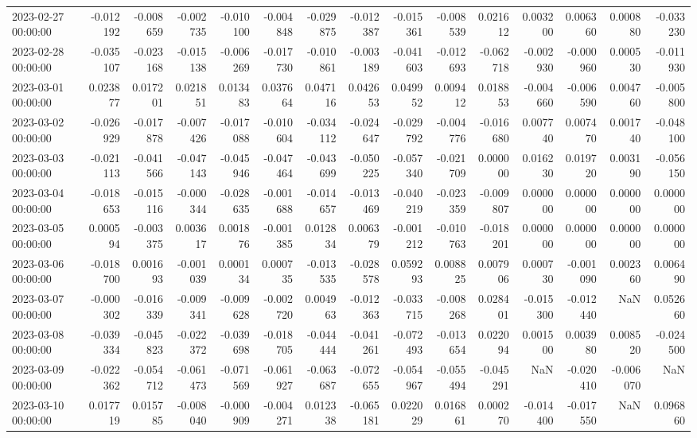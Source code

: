 \begin{tabular}{lrrrrrrrrrrrrrr}
2023-02-27 00:00:00 & -0.012192 & -0.008659 & -0.002735 & -0.010100 & -0.004848 & -0.029875 & -0.012387 & -0.015361 & -0.008539 & 0.021612 & 0.003200 & 0.006360 & 0.000880 & -0.033230 \\
2023-02-28 00:00:00 & -0.035107 & -0.023168 & -0.015138 & -0.006269 & -0.017730 & -0.010861 & -0.003189 & -0.041603 & -0.012693 & -0.062718 & -0.002930 & -0.000960 & 0.000530 & -0.011930 \\
2023-03-01 00:00:00 & 0.023877 & 0.017201 & 0.021851 & 0.013483 & 0.037664 & 0.047116 & 0.042653 & 0.049952 & 0.009412 & 0.018853 & -0.004660 & -0.006590 & 0.004760 & -0.005800 \\
2023-03-02 00:00:00 & -0.026929 & -0.017878 & -0.007426 & -0.017088 & -0.010604 & -0.034112 & -0.024647 & -0.029792 & -0.004776 & -0.016680 & 0.007740 & 0.007470 & 0.001740 & -0.048100 \\
2023-03-03 00:00:00 & -0.021113 & -0.041566 & -0.047143 & -0.045946 & -0.047464 & -0.043699 & -0.050225 & -0.057340 & -0.021709 & 0.000000 & 0.016230 & 0.019720 & 0.003190 & -0.056150 \\
2023-03-04 00:00:00 & -0.018653 & -0.015116 & -0.000344 & -0.028635 & -0.001688 & -0.014657 & -0.013469 & -0.040219 & -0.023359 & -0.009807 & 0.000000 & 0.000000 & 0.000000 & 0.000000 \\
2023-03-05 00:00:00 & 0.000594 & -0.003375 & 0.003617 & 0.001876 & -0.001385 & 0.012834 & 0.006379 & -0.001212 & -0.010763 & -0.018201 & 0.000000 & 0.000000 & 0.000000 & 0.000000 \\
2023-03-06 00:00:00 & -0.018700 & 0.001693 & -0.001039 & 0.000134 & 0.000735 & -0.013535 & -0.028578 & 0.059293 & 0.008825 & 0.007906 & 0.000730 & -0.001090 & 0.002360 & 0.006490 \\
2023-03-07 00:00:00 & -0.000302 & -0.016339 & -0.009341 & -0.009628 & -0.002720 & 0.004963 & -0.012363 & -0.033715 & -0.008268 & 0.028401 & -0.015300 & -0.012440 & NaN & 0.052660 \\
2023-03-08 00:00:00 & -0.039334 & -0.045823 & -0.022372 & -0.039698 & -0.018705 & -0.044444 & -0.041261 & -0.072493 & -0.013654 & 0.022094 & 0.001500 & 0.003980 & 0.008520 & -0.024500 \\
2023-03-09 00:00:00 & -0.022362 & -0.054712 & -0.061473 & -0.071569 & -0.061927 & -0.063687 & -0.072655 & -0.054967 & -0.055494 & -0.045291 & NaN & -0.020410 & -0.006070 & NaN \\
2023-03-10 00:00:00 & 0.017719 & 0.015785 & -0.008040 & -0.000909 & -0.004271 & 0.012338 & -0.065181 & 0.022029 & 0.016861 & 0.000270 & -0.014400 & -0.017550 & NaN & 0.096860 \\

\end{tabular}
